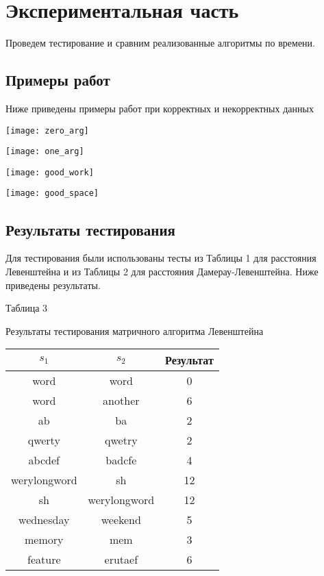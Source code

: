 \newpage
\section{Экспериментальная часть}

Проведем тестирование и сравним реализованные алгоритмы по времени.

\subsection{Примеры работ}

Ниже приведены примеры работ при корректных и некорректных данных

\texttt{[image: zero\_arg]}

\texttt{[image: one\_arg]}

\texttt{[image: good\_work]}

\texttt{[image: good\_space]}

\subsection{Результаты тестирования}

Для тестирования были использованы тесты из Таблицы 1 для расстояния
Левенштейна и из Таблицы 2 для расстояния Дамерау-Левенштейна. Ниже
приведены результаты.

\begin{flushright}
    Таблица 3
\end{flushright}

\begin{center}
    Результаты тестирования матричного алгоритма Левенштейна

    \begin{tabular}{|c|c|c|}
        \hline
        $s_1$ & $s_2$ & Результат \\
        \hline
        word & word & 0 \\
        \hline
        word & another & 6 \\
        \hline
        ab & ba & 2 \\
        \hline
        qwerty & qwetry & 2 \\
        \hline
        abcdef & badcfe & 4 \\
        \hline
        werylongword & sh & 12 \\
        \hline
        sh & werylongword & 12 \\
        \hline
        wednesday & weekend & 5 \\
        \hline
        memory & mem & 3 \\
        \hline
        feature & erutaef & 6 \\
        \hline
    \end{tabular}
\end{center}

